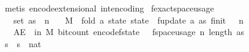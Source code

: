 \begin{isabellebody}
\ {\isacharparenleft}{\kern0pt}metis\ encode{\isacharunderscore}{\kern0pt}extensional\ int{\isacharunderscore}{\kern0pt}encoding{\isacharparenright}{\kern0pt}%
\endisatagproof
{\isafoldproof}%
%
\isadelimproof
\isanewline
%
\endisadelimproof
\isanewline
{}\isamarkupfalse%
\ f{}{\isacharunderscore}{\kern0pt}exact{\isacharunderscore}{\kern0pt}space{\isacharunderscore}{\kern0pt}usage{\isacharcolon}{\kern0pt}\isanewline
\ \ \ {\isachardoublequoteopen}{\isasymepsilon}\ {\isasymin}\ {\isacharbraceleft}{\kern0pt}{}{\isacharless}{\kern0pt}{\isachardot}{\kern0pt}{\isachardot}{\kern0pt}{\isacharless}{\kern0pt}{}{\isacharbraceright}{\kern0pt}{\isachardoublequoteclose}\isanewline
\ \ \ {\isachardoublequoteopen}{\isasymdelta}\ {\isachargreater}{\kern0pt}\ {}{\isachardoublequoteclose}\isanewline
\ \ \ {\isachardoublequoteopen}set\ as\ {\isasymsubseteq}\ {\isacharbraceleft}{\kern0pt}{}{\isachardot}{\kern0pt}{\isachardot}{\kern0pt}{\isacharless}{\kern0pt}n{\isacharbraceright}{\kern0pt}{\isachardoublequoteclose}\isanewline
\ \ \ {\isachardoublequoteopen}M\ {\isasymequiv}\ fold\ {\isacharparenleft}{\kern0pt}{\isasymlambda}a\ state{\isachardot}{\kern0pt}\ state\ {\isasymbind}\ f{}{\isacharunderscore}{\kern0pt}update\ a{\isacharparenright}{\kern0pt}\ as\ {\isacharparenleft}{\kern0pt}f{}{\isacharunderscore}{\kern0pt}init\ {\isasymdelta}\ {\isasymepsilon}\ n{\isacharparenright}{\kern0pt}{\isachardoublequoteclose}\isanewline
\ \ \ {\isachardoublequoteopen}AE\ {\isasymomega}\ in\ M{\isachardot}{\kern0pt}\ bit{\isacharunderscore}{\kern0pt}count\ {\isacharparenleft}{\kern0pt}encode{\isacharunderscore}{\kern0pt}f{}{\isacharunderscore}{\kern0pt}state\ {\isasymomega}{\isacharparenright}{\kern0pt}\ {\isasymle}\ f{}{\isacharunderscore}{\kern0pt}space{\isacharunderscore}{\kern0pt}usage\ {\isacharparenleft}{\kern0pt}n{\isacharcomma}{\kern0pt}\ length\ as{\isacharcomma}{\kern0pt}\ {\isasymepsilon}{\isacharcomma}{\kern0pt}\ {\isasymdelta}{\isacharparenright}{\kern0pt}{\isachardoublequoteclose}\isanewline
%
\isadelimproof
%
\endisadelimproof
%
\isatagproof
{}\isamarkupfalse%
\ {\isacharminus}{\kern0pt}\isanewline
\ \ \isamarkupfalse%
\ s\ \ {\isachardoublequoteopen}s\ {\isacharequal}{\kern0pt}\ nat\ {\isasymlceil}{}\ {\isacharslash}{\kern0pt}\ {\isasymdelta}\isanewline

\end{isabellebody}
